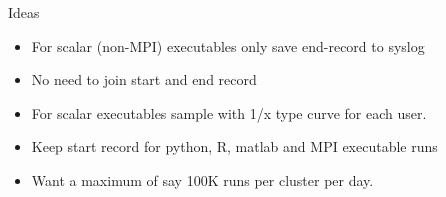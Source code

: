 \documentclass{beamer}
\begin{document}
\begin{frame}{Ideas}
  \begin{itemize}
    \item For scalar (non-MPI) executables only save end-record to
      syslog
    \item No need to join start and end record
    \item For scalar executables sample with 1/x type curve for each user.
    \item Keep start record for python, R, matlab and MPI executable runs
    \item Want a maximum of say 100K runs per cluster per day.
  \end{itemize}
\end{frame}
\end{document}

